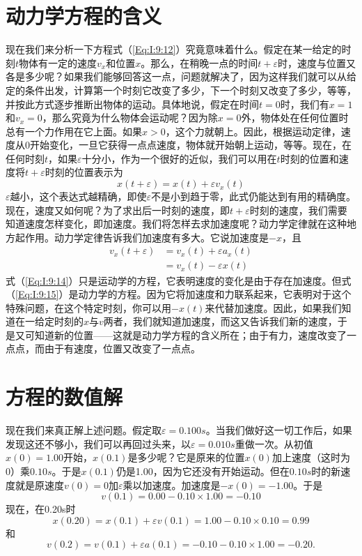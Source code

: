 \section{动力学方程的含义}

现在我们来分析一下方程式（\ref{Eq:I:9:12}）究竟意味着什么。假定在某一给定的时刻$t$物体有一定的速度$v_x$和位置$x$。那么，在稍晚一点的时间$t+\varepsilon $时，速度与位置又各是多少呢？如果我们能够回答这一点，问题就解决了，因为这样我们就可以从给定的条件出发，计算第一个时刻它改变了多少，下一个时刻又改变了多少，等等，并按此方式逐步推断出物体的运动。具体地说，假定在时间$t=0$时，我们有$x=1$和$v_x=0$，那么究竟为什么物体会运动呢？因为除$x=0$外，物体处在任何位置时总有一个力作用在它上面。如果$x>0$，这个力就朝上。因此，根据运动定律，速度从0开始变化，一旦它获得一点点速度，物体就开始朝上运动，等等。现在，在任何时刻$t$，如果$\varepsilon $十分小，作为一个很好的近似，我们可以用在$t$时刻的位置和速度将$t+\varepsilon $时刻的位置表示为
\begin{equation}
    \label{Eq:I:9:13}
    x(t+\varepsilon)=x(t)+\varepsilon v_x(t)
\end{equation}
$\varepsilon $越小，这个表达式越精确，即使$\varepsilon $不是小到趋于零，此式仍能达到有用的精确度。现在，速度又如何呢？为了求出后一时刻的速度，即$t+\varepsilon$时刻的速度，我们需要知道速度怎样变化，即加速度。我们将怎样去求加速度呢？动力学定律就在这种地方起作用。动力学定律告诉我们加速度有多大。它说加速度是$-x$，且
\begin{align}
    \label{Eq:I:9:14}
    v_x(t+\varepsilon)&=v_x(t)+\varepsilon a_x(t) \\
    \label{Eq:I:9:15}
    &=v_x(t)-\varepsilon x(t)
\end{align}
式（\ref{Eq:I:9:14}）只是运动学的方程，它表明速度的变化是由于存在加速度。但式（\ref{Eq:I:9:15}）是动力学的方程。因为它将加速度和力联系起来，它表明对于这个特殊问题，在这个特定时刻，你可以用$-x(t)$来代替加速度。因此，如果我们知道在一给定时刻的$x$与$v$两者，我们就知道加速度，而这又告诉我们新的速度，于是又可知道新的位置——这就是动力学方程的含义所在；由于有力，速度改变了一点点，而由于有速度，位置又改变了一点点。

\section{方程的数值解}

现在我们来真正解上述问题。假定取$\varepsilon =0.100s$。当我们做好这一切工作后，如果发现这还不够小，我们可以再回过头来，以$\varepsilon =0.010s$重做一次。从初值$x(0)=1.00$开始，$x(0.1)$是多少呢？它是原来的位置$x(0)$加上速度（这时为0）乘$0.10s$。于是$x(0.1)$仍是1.00，因为它还没有开始运动。但在$0.10s$时的新速度就是原速度$v(0)=0$加$\varepsilon $乘以加速度。加速度是$-x(0)=-1.00$。于是
\begin{equation*}
    v(0.1)=0.00-0.10 \times 1.00 = -0.10
\end{equation*}
现在，在0.20s时
\begin{equation*}
x(0.20)=x(0.1)+\varepsilon v(0.1)=1.00-0.10 \times 0.10=0.99
\end{equation*}
和
\begin{equation*}
v(0.2)=v(0.1)+\varepsilon a(0.1)=-0.10-0.10 \times 1.00=-0.20.
\end{equation*}

